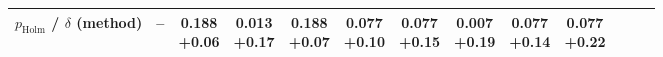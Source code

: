 \begin{table}[!t]
\begin{tabular*}{\linewidth}{@{\extracolsep{\fill}}lcccccccccccc}
\shortstack[l]{$p_{\mathrm{Holm}}$ / $\delta$\\(method)} & -- & \shortstack{0.188\\+0.06} & \shortstack{0.013\\+0.17} & \shortstack{0.188\\+0.07} & \shortstack{0.077\\+0.10} & \shortstack{0.077\\+0.15} & \shortstack{0.007\\+0.19} & \shortstack{0.077\\+0.14} & \shortstack{0.077\\+0.22} &  &  &  \\
\bottomrule
\end{tabular*}
\end{table}

